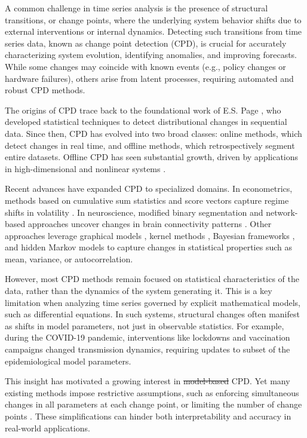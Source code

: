 \documentclass[10pt,letterpaper]{article}
\makeatletter
\providecommand{\DIFaddtex}[1]{{\protect\color{blue}\uwave{#1}}} %
\providecommand{\DIFdeltex}[1]{{\protect\color{red}\sout{#1}}} %
\providecommand{\DIFaddbegin}{} %
\providecommand{\DIFaddend}{} %
\providecommand{\DIFdelbegin}{} %
\providecommand{\DIFdelend}{} %
\providecommand{\DIFadd}[1]{\texorpdfstring{\DIFaddtex{#1}}{#1}} %
\providecommand{\DIFdel}[1]{\texorpdfstring{\DIFdeltex{#1}}{}} %
\providecommand{\DIFscaledelfig}{0.5}
\newlength{\DIFdelgraphicswidth} %
\newlength{\DIFdelgraphicsheight} %
\providecommand{\DIFaddincludegraphics}[2][]{{\color{blue}\fbox{\DIFOincludegraphics[#1]{#2}}}} %
\providecommand{\DIFdelincludegraphics}[2][]{%
\sbox{\DIFdelgraphicsbox}{\DIFOincludegraphics[#1]{#2}}%
\settoboxwidth{\DIFdelgraphicswidth}{\DIFdelgraphicsbox} %
\settoboxtotalheight{\DIFdelgraphicsheight}{\DIFdelgraphicsbox} %
\scalebox{\DIFscaledelfig}{%
\parbox[b]{\DIFdelgraphicswidth}{\usebox{\DIFdelgraphicsbox}\\[-\baselineskip] \rule{\DIFdelgraphicswidth}{0em}}\llap{\resizebox{\DIFdelgraphicswidth}{\DIFdelgraphicsheight}{%
\setlength{\unitlength}{\DIFdelgraphicswidth}%
\begin{picture}(1,1)%
\thicklines\linethickness{2pt} %
{\color[rgb]{1,0,0}\put(0,0){\framebox(1,1){}}}%
{\color[rgb]{1,0,0}\put(0,0){\line( 1,1){1}}}%
{\color[rgb]{1,0,0}\put(0,1){\line(1,-1){1}}}%
\end{picture}%
}\hspace*{3pt}}} %
} %
\DeclareRobustCommand{\DIFaddbegin}{\DIFOaddbegin \let\includegraphics\DIFaddincludegraphics} %
\DeclareRobustCommand{\DIFaddend}{\DIFOaddend \let\includegraphics\DIFOincludegraphics} %
\DeclareRobustCommand{\DIFdelbegin}{\DIFOdelbegin \let\includegraphics\DIFdelincludegraphics} %
\DeclareRobustCommand{\DIFdelend}{\DIFOaddend \let\includegraphics\DIFOincludegraphics} %
\let\sout@orig\sout %
\renewcommand{\sout}[1]{\ifmmode\text{\sout@orig{\ensuremath{#1}}}\else\sout@orig{#1}\fi} %
\makeatother
\begin{document}
A common challenge in time series analysis is the presence of structural transitions, or change points, where the underlying system behavior shifts due to external interventions or internal dynamics. Detecting such transitions from time series data, known as change point detection (CPD), is crucial for accurately characterizing system evolution, identifying anomalies, and improving forecasts. While some changes may coincide with known events (e.g., policy changes or hardware failures), others arise from latent processes, requiring automated and robust CPD methods.

The origins of CPD trace back to the foundational work of E.S. Page \cite{page1954continuous,page1955test}, who developed statistical techniques to detect distributional changes in sequential data. Since then, CPD has evolved into two broad classes: online methods, which detect changes in real time, and offline methods, which retrospectively segment entire datasets. Offline CPD has seen substantial growth, driven by applications in high-dimensional and nonlinear systems \cite{truong2020selective}.

Recent advances have expanded CPD to specialized domains. In econometrics, methods based on cumulative sum statistics and score vectors capture regime shifts in volatility \cite{lee2024sequential}.  In neuroscience, modified binary segmentation and network-based approaches uncover changes in brain connectivity patterns \cite{ondrus2024fabisearch, OriginBinSeg}. Other approaches leverage graphical models \cite{gong2023latent}, kernel methods \cite{cui2023state}, Bayesian frameworks \cite{shishavan2024unsupervised}, and hidden Markov models \cite{janczura2023machine} to capture changes in statistical properties such as mean, variance, or autocorrelation.

However, most CPD methods remain focused on statistical characteristics of the data, rather than the dynamics of the system generating it. This is a key limitation when analyzing time series governed by explicit mathematical models, such as differential equations. In such systems, structural changes often manifest as shifts in model parameters, not just in observable statistics. For example, during the COVID-19 pandemic, interventions like lockdowns and vaccination campaigns changed transmission dynamics, requiring updates to subset of the epidemiological model parameters.

This insight has motivated a growing interest in \DIFdelbegin \DIFdel{model-based }\DIFdelend \DIFaddbegin \DIFadd{model-informed }\DIFaddend CPD. Yet many existing methods impose restrictive assumptions, such as enforcing simultaneous changes in all parameters at each change point, or limiting the number of change points \cite{dass2021data, gu2022bayesian, jiang2020bayessmiles}. These simplifications can hinder both interpretability and accuracy in real-world applications.
\end{document}
